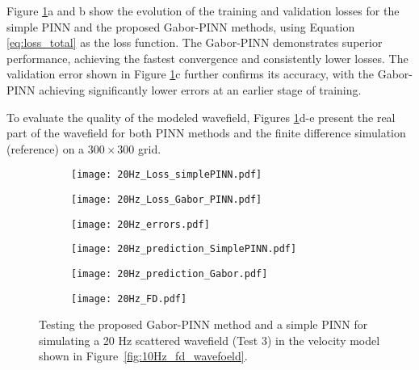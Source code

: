 \documentclass[authoryear, preprint, 12pt]{elsarticle}
\begin{document}
Figure \ref{fig:20Hz_test}a and b show the evolution of the training and validation losses for the simple PINN and the proposed Gabor-PINN methods, using Equation \ref{eq:loss_total} as the loss function. The Gabor-PINN demonstrates superior performance, achieving the fastest convergence and consistently lower losses. The validation error shown in Figure \ref{fig:20Hz_test}c further confirms its accuracy, with the Gabor-PINN achieving significantly lower errors at an earlier stage of training.

To evaluate the quality of the modeled wavefield, Figures \ref{fig:20Hz_test}d-e present the real part of the wavefield for both PINN methods and the finite difference simulation (reference) on a $300 \times 300$ grid.

	
	
	\begin{figure}[h]
		\centering
		\begin{subfigure}[b]{0.32\textwidth}
			\texttt{[image: 20Hz\_Loss\_simplePINN.pdf]}
		\end{subfigure}
		\begin{subfigure}[b]{0.32\textwidth}
			\texttt{[image: 20Hz\_Loss\_Gabor\_PINN.pdf]}
		\end{subfigure}
		\begin{subfigure}[b]{0.32\textwidth}
			\texttt{[image: 20Hz\_errors.pdf]}
		\end{subfigure}
		
		\begin{subfigure}[b]{0.32\textwidth}
			\texttt{[image: 20Hz\_prediction\_SimplePINN.pdf]}
		\end{subfigure}
		\begin{subfigure}[b]{0.32\textwidth}
			\texttt{[image: 20Hz\_prediction\_Gabor.pdf]}
		\end{subfigure}
		\begin{subfigure}[b]{0.32\textwidth}
			\texttt{[image: 20Hz\_FD.pdf]}
		\end{subfigure}
		
\caption{Testing the proposed Gabor-PINN method and a simple PINN for simulating a 20 Hz scattered wavefield (Test 3) in the velocity model shown in Figure~\ref{fig:10Hz_fd_wavefoeld}.}
\label{fig:20Hz_test}
	\end{figure}
	
\end{document}
